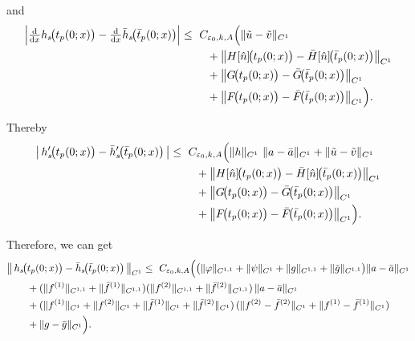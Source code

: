 \documentclass[a4paper,reqno,11pt]{amsart}
\numberwithin{equation}{section} %
\begin{document}
and
\[
\begin{aligned}
\Bigl|\tfrac{\mathrm d}{\mathrm dx}h_s\!\bigl(t_p(0;x)\bigr)
 - \tfrac{\mathrm d}{\mathrm dx}\bar h_s\!\bigl(\bar t_p(0;x)\bigr)\Bigr|
\le{}&\ C_{\varepsilon_0,k,A}\Bigl(
  \|\tilde u-\tilde v\|_{C^{1}} \\
&\quad + \bigl\| H[\hat n]\!\bigl(t_p(0;x)\bigr)
          - \bar H[\hat n]\!\bigl(\bar t_p(0;x)\bigr) \bigr\|_{C^{1}} \\
&\quad + \bigl\| G\!\bigl(t_p(0;x)\bigr)
          - \bar G\!\bigl(\bar t_p(0;x)\bigr) \bigr\|_{C^{1}} \\
&\quad + \bigl\| F\!\bigl(t_p(0;x)\bigr)
          - \bar F\!\bigl(\bar t_p(0;x)\bigr) \bigr\|_{C^{1}}
\Bigr).
\end{aligned}
\]

Thereby
\[
\begin{aligned}
\bigl|\,h'_s\!\bigl(t_p(0;x)\bigr)-\bar h'_s\!\bigl(\bar t_p(0;x)\bigr)\,\bigr|
\le{}&\ C_{\varepsilon_0,k,A}\Bigl(
  \|h\|_{C^{1}}\ \|a-\bar a\|_{C^{1}}
  + \|\tilde u-\tilde v\|_{C^{1}} \\
&\quad + \bigl\| H[\hat n]\!\bigl(t_p(0;x)\bigr)-\bar H[\hat n]\!\bigl(\bar t_p(0;x)\bigr) \bigr\|_{C^{1}} \\
&\quad + \bigl\| G\!\bigl(t_p(0;x)\bigr)-\bar G\!\bigl(\bar t_p(0;x)\bigr) \bigr\|_{C^{1}} \\
&\quad + \bigl\| F\!\bigl(t_p(0;x)\bigr)-\bar F\!\bigl(\bar t_p(0;x)\bigr) \bigr\|_{C^{1}}
\Bigr).
\end{aligned}
\]

Therefore, we can get
\[
\begin{aligned}
&\bigl\|\,h_s\!\bigl(t_p(0;x)\bigr)-\bar h_s\!\bigl(\bar t_p(0;x)\bigr)\,\bigr\|_{C^{1}}
\le{}\ C_{\varepsilon_0,k,A}\Bigl(
	\bigl(\|\varphi\|_{C^{1,1}}+\|\psi\|_{C^{1}}
     + \|g\|_{C^{1,1}}+\|\bar g\|_{C^{1,1}}\bigr)\|a-\bar a\|_{C^{1}}
 \\
&\qquad
     + (\|f^{(1)}\|_{C^{1,1}}+\|\bar f^{(1)}\|_{C^{1,1}})
       (\|f^{(2)}\|_{C^{1,1}}+\|\bar f^{(2)}\|_{C^{1,1}})\,
    \|a-\bar a\|_{C^{1}} \\
&\qquad
	 + (\|f^{(1)}\|_{C^{1}}+\|f^{(2)}\|_{C^{1}}
   +\|\bar f^{(1)}\|_{C^{1}}+\|\bar f^{(2)}\|_{C^{1}})\,
  (\|f^{(2)}-\bar f^{(2)}\|_{C^{1}}
   +\|f^{(1)}-\bar f^{(1)}\|_{C^{1}})\\
&\qquad
  + \|g-\bar g\|_{C^{1}}
\Bigr).
\end{aligned}
\]
\end{document}

